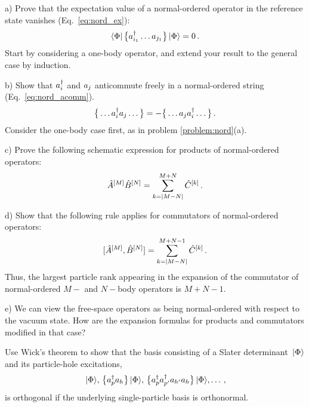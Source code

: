 \begin{prob}\label{problem:nord}
  \item[a)] Prove that the expectation value of a normal-ordered operator in the
  reference state vanishes (Eq.~\eqref{eq:nord_ex}):
    \begin{equation}
      \langle{\Phi}|\,{\big\{a^\dag_{i_1}\ldots a_{j_1}\big\}}\,|{\Phi}\rangle = 0\,.
    \end{equation}
  Start by considering a one-body operator, and extend your result to the general
  case by induction.
  \item[b)] Show that $a^\dag_i$ and $a_j$ anticommute freely in a normal-ordered
  string (Eq.~\eqref{eq:nord_acomm}). 
  \begin{equation}
    \big\{\ldots a^\dag_ia_j\ldots\big\} = -\big\{\ldots a_ja^\dag_i\ldots\big\}\,.
  \end{equation}
  Consider the one-body case first, as in problem \ref{problem:nord}(a).
  \item[c)] Prove the following schematic expression for products of normal-ordered
  operators:
    \begin{equation}
      \hat{A}^{[M]}\hat{B}^{[N]} = \sum_{k=|M-N|}^{M+N}\hat{C}^{[k]}\,.
    \end{equation}
  \item[d)] Show that the following rule applies for commutators of normal-ordered
    operators:
    \begin{equation}
      [{\hat{A}^{[M]}},{\hat{B}^{[N]}}] = \sum_{k=|M-N|}^{M+N-1}\hat{C}^{[k]}\,.
    \end{equation}
    Thus, the largest particle rank appearing in the expansion of the commutator of 
    normal-ordered $M-$ and $N-$body operators is $M+N-1$.
  \item[e)] We can view the free-space operators as being normal-ordered with respect
    to the vacuum state. How are the expansion formulas for products and commutators
    modified in that case?
\end{prob}

\begin{prob}\label{problem:ph_orthogonality}
  Use Wick's theorem to show that the basis consisting of a Slater determinant $\,|{\Phi}\rangle$ 
  and its particle-hole excitations, 
  \begin{equation}
    \,|{\Phi}\rangle,\,\big\{a^\dag_{p}a_h\big\}\,|{\Phi}\rangle,\,\big\{a^\dag_{p}a^\dag_{p'}a_{h'}a_{h}\big\}\,|{\Phi}\rangle,\ldots\,,
  \end{equation}
  is orthogonal if the underlying single-particle basis is orthonormal.
\end{prob}


